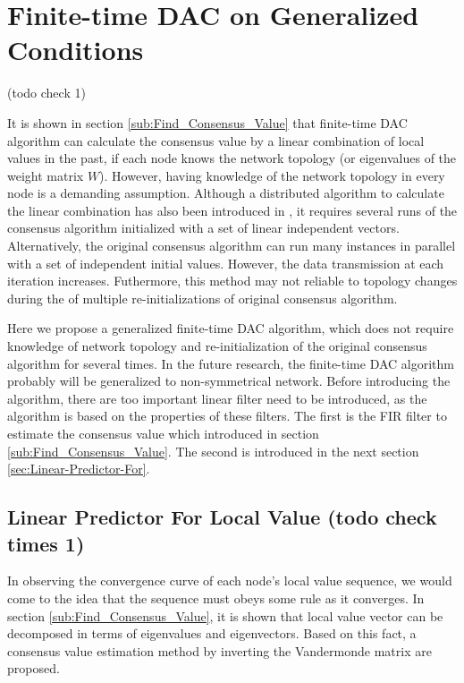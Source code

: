 
\chapter{\label{sub:Finite-time-Consensus-on}Finite-time DAC on Generalized
Conditions }

(todo check 1)

It is shown in section \ref{sub:Find_Consensus_Value} that finite-time
DAC algorithm can calculate the consensus value by a linear combination
of local values in the past, if each node knows the network topology
(or eigenvalues of the weight matrix $W$). However, having knowledge
of the network topology in every node is a demanding assumption. Although
a distributed algorithm to calculate the linear combination has also
been introduced in \cite{Sundaram2007}, it requires several runs
of the consensus algorithm initialized with a set of linear independent
vectors. Alternatively, the original consensus algorithm can run many
instances in parallel with a set of independent initial values. However,
the data transmission at each iteration increases. Futhermore, this
method may not reliable to topology changes during the of multiple
re-initializations of original consensus algorithm. 

Here we propose a generalized finite-time DAC algorithm, which does
not require knowledge of network topology and re-initialization of
the original consensus algorithm for several times. In the future
research, the finite-time DAC algorithm probably will be generalized
to non-symmetrical network. Before introducing the algorithm, there
are too important linear filter need to be introduced, as the algorithm
is based on the properties of these filters. The first is the FIR
filter to estimate the consensus value which introduced in section
\ref{sub:Find_Consensus_Value}. The second is introduced in the next
section \ref{sec:Linear-Predictor-For}.


\section{\label{sec:Linear-Predictor-For}Linear Predictor For Local Value
(todo check times 1)}

In observing the convergence curve of each node's local value sequence,
we would come to the idea that the sequence must obeys some rule as
it converges. In section \ref{sub:Find_Consensus_Value}, it is shown
that local value vector can be decomposed in terms of eigenvalues
and eigenvectors. Based on this fact, a consensus value estimation
method by inverting the Vandermonde matrix  are proposed.

